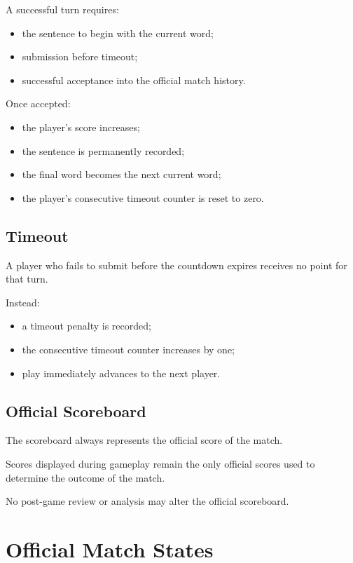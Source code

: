 \documentclass[11pt,a4paper]{article}
\begin{document}
A successful turn requires:

\begin{itemize}
    \item the sentence to begin with the current word;
    \item submission before timeout;
    \item successful acceptance into the official match history.
\end{itemize}

Once accepted:

\begin{itemize}
    \item the player's score increases;
    \item the sentence is permanently recorded;
    \item the final word becomes the next current word;
    \item the player's consecutive timeout counter is reset to zero.
\end{itemize}

\subsection{Timeout}

A player who fails to submit before the countdown expires receives no point for that turn.

Instead:

\begin{itemize}
    \item a timeout penalty is recorded;
    \item the consecutive timeout counter increases by one;
    \item play immediately advances to the next player.
\end{itemize}

\subsection{Official Scoreboard}

The scoreboard always represents the official score of the match.

Scores displayed during gameplay remain the only official scores used to determine the outcome of the match.

No post-game review or analysis may alter the official scoreboard.

\section{Official Match States}
\end{document}
